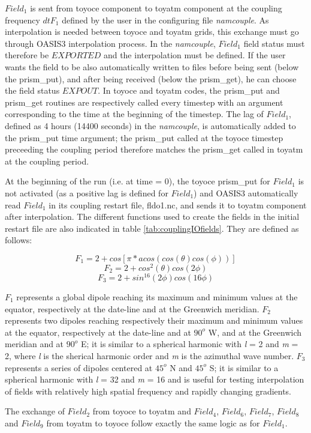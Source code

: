$Field_1$ is sent from toyoce component to toyatm component at the
coupling frequency $dtF_1$ defined by the user in the configuring file
{\it namcouple}. As interpolation is
needed between toyoce and toyatm grids, this exchange must go through
OASIS3 interpolation process. In the {\it namcouple}, $Field_1$ field status
must therefore be $EXPORTED$ and the interpolation must be defined. If
the user wants the field to be also automatically written to files
before being sent (below the prism\_put), and after being received (below
the prism\_get), he can choose the field status $EXPOUT$. In toyoce and toyatm
codes, the prism\_put and prism\_get routines are respectively called
every timestep with an argument corresponding to the time at the
beginning of the timestep. The lag of $Field_1$, defined as 4 hours
(14400 seconds) in the {\it namcouple}, is automatically added to the
prism\_put time argument; the prism\_put called at the toyoce timestep
preceeding the coupling period therefore matches the prism\_get called
in toyatm at the coupling period.

At the beginning of the run (i.e. at time = 0), the toyoce prism\_put for
$Field_1$ is not activated (as a positive lag is defined for
$Field_1$) and OASIS3 automatically read $Field_1$ in its coupling
restart file, fldo1.nc, and sends it to toyatm component after
interpolation. The different functions used to create the fields in
the initial restart file are also indicated in table
\ref{tab:couplingIOfields}. They are defined as follows:

$$ F_1 = 2+ cos[\pi * acos(cos(\theta)cos(\phi))] $$
$$ F_2 = 2 + cos^{2}(\theta) cos(2\phi)$$
$$ F_3 = 2 + sin^{16}(2 \phi) cos(16 \phi)$$

$F_1$ represents a global dipole reaching its maximum and minimum
values at the equator, respectively at the date-line and at the
Greenwich meridian. $F_2$ represents two dipoles reaching
respectively their maximum and minimum
values at the equator, respectively at the date-line and at $90^{o}$ W, and at the
Greenwich meridian and at $90^{o}$ E; it is similar to
a spherical harmonic with {\it l} = 2 and {\it m} = 2, where {\it l}
is the sherical harmonic order and {\it m} is the azimuthal wave
number. $F_3$ represents a series of dipoles centered at $45^{o}$ N
and $45^{o}$ S; it is similar to
a spherical harmonic with {\it l} = 32 and {\it m} = 16 and is useful
for testing interpolation of fields with relatively high spatial
frequency and rapidly changing gradients.

The exchange of $Field_2$ from toyoce to toyatm and $Field_4$, $Field_6$,
$Field_7$, $Field_8$ and $Field_9$ from toyatm to toyoce follow exactly the
same logic as for $Field_1$.

